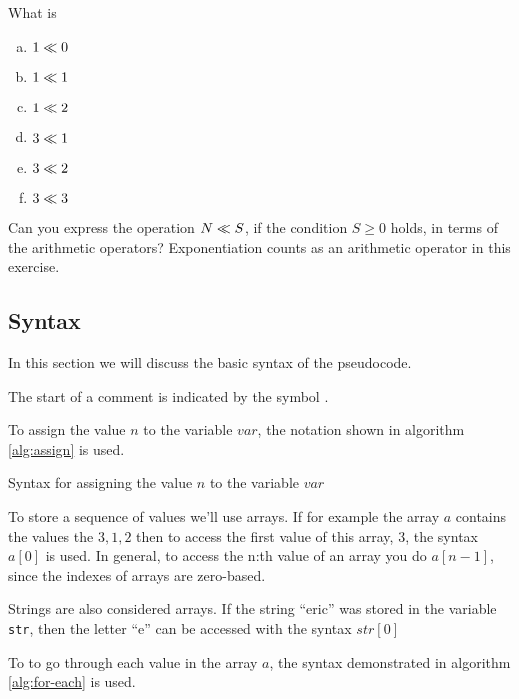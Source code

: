 \begin{Exercise}[label={bit-equiv}]

  What is

  \begin{enumerate}[(a)]
  \item $1 \ll 0$
  \item $1 \ll 1$
  \item $1 \ll 2$
  \item $3 \ll 1$
  \item $3 \ll 2$
  \item $3 \ll 3$
  \end{enumerate}

  Can you express the operation $N \ll S$, if the condition $S
  \geq 0$ holds, in terms of the arithmetic operators? Exponentiation
  counts as an arithmetic operator in this exercise.

\end{Exercise}


\subsection{Syntax}

In this section we will discuss the basic syntax of the pseudocode.

The start of a comment is indicated by the symbol \commentsymbol.

To assign the value $n$ to the variable $var$, the notation shown in
algorithm \ref{alg:assign} is used.

\begin{algorithm}[H]
  \caption{Syntax for assigning the value $n$ to the variable $var$}
  \label{alg:assign}
  \begin{algorithmic}[1]
  \end{algorithmic}
\end{algorithm}

To store a sequence of values we'll use arrays. If for example the
array $a$ contains the values the $3,1,2$ then to access the first
value of this array, $3$, the syntax $a[0]$ is used. In general, to
access the n:th value of an array you do $a[n-1]$, since the indexes
of arrays are zero-based.

Strings are also considered arrays. If the string ``eric'' was
stored in the variable \texttt{str}, then the letter ``e'' can be
accessed with the syntax $str[0]$

To to go through each value in the array $a$, the syntax demonstrated
in algorithm \ref{alg:for-each} is used.

